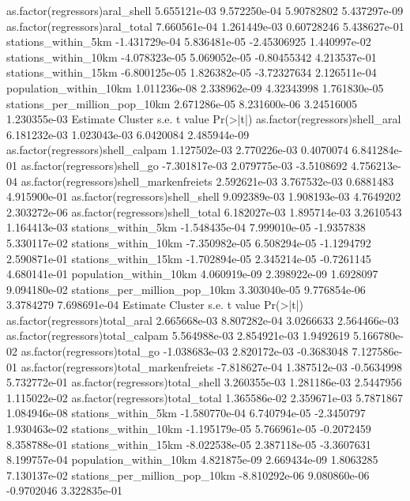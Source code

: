 as.factor(regressors)aral_shell          5.655121e-03 9.572250e-04  5.90782802 5.437297e-09
as.factor(regressors)aral_total          7.660561e-04 1.261449e-03  0.60728246 5.438627e-01
stations_within_5km                     -1.431729e-04 5.836481e-05 -2.45306925 1.440997e-02
stations_within_10km                    -4.078323e-05 5.069052e-05 -0.80455342 4.213537e-01
stations_within_15km                    -6.800125e-05 1.826382e-05 -3.72327634 2.126511e-04
population_within_10km                   1.011236e-08 2.338962e-09  4.32343998 1.761830e-05
stations_per_million_pop_10km            2.671286e-05 8.231600e-06  3.24516005 1.230355e-03
                                              Estimate Cluster s.e.    t value     Pr(>|t|)
as.factor(regressors)shell_aral           6.181232e-03 1.023043e-03  6.0420084 2.485944e-09
as.factor(regressors)shell_calpam         1.127502e-03 2.770226e-03  0.4070074 6.841284e-01
as.factor(regressors)shell_go            -7.301817e-03 2.079775e-03 -3.5108692 4.756213e-04
as.factor(regressors)shell_markenfreiets  2.592621e-03 3.767532e-03  0.6881483 4.915900e-01
as.factor(regressors)shell_shell          9.092389e-03 1.908193e-03  4.7649202 2.303272e-06
as.factor(regressors)shell_total          6.182027e-03 1.895714e-03  3.2610543 1.164413e-03
stations_within_5km                      -1.548435e-04 7.999010e-05 -1.9357838 5.330117e-02
stations_within_10km                     -7.350982e-05 6.508294e-05 -1.1294792 2.590871e-01
stations_within_15km                     -1.702894e-05 2.345214e-05 -0.7261145 4.680141e-01
population_within_10km                    4.060919e-09 2.398922e-09  1.6928097 9.094180e-02
stations_per_million_pop_10km             3.303040e-05 9.776854e-06  3.3784279 7.698691e-04
                                              Estimate Cluster s.e.    t value     Pr(>|t|)
as.factor(regressors)total_aral           2.665668e-03 8.807282e-04  3.0266633 2.564466e-03
as.factor(regressors)total_calpam         5.564988e-03 2.854921e-03  1.9492619 5.166780e-02
as.factor(regressors)total_go            -1.038683e-03 2.820172e-03 -0.3683048 7.127586e-01
as.factor(regressors)total_markenfreiets -7.818627e-04 1.387512e-03 -0.5634998 5.732772e-01
as.factor(regressors)total_shell          3.260355e-03 1.281186e-03  2.5447956 1.115022e-02
as.factor(regressors)total_total          1.365586e-02 2.359671e-03  5.7871867 1.084946e-08
stations_within_5km                      -1.580770e-04 6.740794e-05 -2.3450797 1.930463e-02
stations_within_10km                     -1.195179e-05 5.766961e-05 -0.2072459 8.358788e-01
stations_within_15km                     -8.022538e-05 2.387118e-05 -3.3607631 8.199757e-04
population_within_10km                    4.821875e-09 2.669434e-09  1.8063285 7.130137e-02
stations_per_million_pop_10km            -8.810292e-06 9.080860e-06 -0.9702046 3.322835e-01

